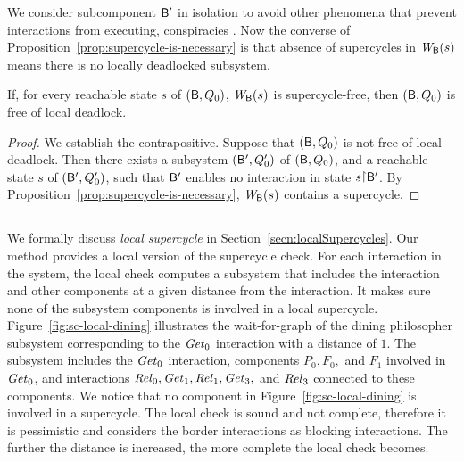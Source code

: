We consider subcomponent $\mathsf{B}'$ in isolation to avoid other phenomena that prevent interactions from executing, \eg
conspiracies \cite{AFG93}.  
Now the converse of Proposition~\ref{prop:supercycle-is-necessary} is that absence of
supercycles in $\mathit{W}_{\mathsf{B}}({s})$ means there is no locally deadlocked subsystem. 



\begin{corollary}
\label{cor:static:dead-free}
If, for every reachable state $s$ of $(\mathsf{B},Q_0)$, $\mathit{W}_{\mathsf{B}}({s})$ is supercycle-free, then
$(\mathsf{B},Q_0)$ is free of local deadlock.
\end{corollary}
%
\begin{proof}
We establish the contrapositive.
Suppose that $(\mathsf{B}, Q_0)$ is not free of local deadlock. Then there exists a subsystem $(\mathsf{B}', Q'_0)$ of $(\mathsf{B}, Q_0)$, and
a reachable state $s$ of $(\mathsf{B}', Q'_0)$, such that $\mathsf{B}'$ enables no interaction in state  $s \pj \B'$.
By Proposition~\ref{prop:supercycle-is-necessary}, $\mathit{W}_{\mathsf{B}}({s})$ contains a supercycle.
\end{proof}




\subsection{}
We formally discuss {\em local supercycle} in Section~\ref{secn:localSupercycles}.
Our method provides a local version of the supercycle check. 
For each interaction in the system, the local check computes a subsystem 
that includes the interaction and other components at a given distance from 
the interaction. 
It makes sure none of the subsystem components is involved in a local supercycle. 
%
Figure~\ref{fig:sc-local-dining} illustrates the wait-for-graph of the dining philosopher subsystem 
corresponding to the $\mathit{Get}_0$ interaction with a distance of $1$. 
The subsystem includes the $\mathit{Get}_0$ interaction, 
components $P_0, F_0,$ and $F_1$ involved in $\mathit{Get}_0$, 
and interactions $\mathit{Rel}_0, \mathit{Get}_1,\mathit{Rel}_1, \mathit{Get}_3,$ and $\mathit{Rel}_3$ connected to these components. 
We notice that no component in Figure~\ref{fig:sc-local-dining} is involved in a supercycle. 
%
The local check is sound and not complete, therefore it is pessimistic and considers 
the border interactions as blocking interactions. 
The further the distance is increased, the more complete the local check becomes. 

